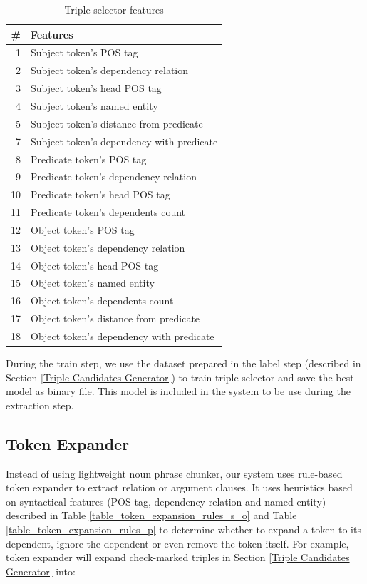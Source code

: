 \documentclass[peerreview,12pt]{IEEEtran}
\begin{document}
\begin{table}[!t]
\renewcommand{\arraystretch}{1.5}
\caption{Triple selector features}
\label{table_models_features}
\centering
\begin{tabular}{r l}
\hline
\textbf{\#} & \textbf{Features} \\
\hline
1 & Subject token's POS tag \\
2 & Subject token's dependency relation \\
3 & Subject token's head POS tag \\
4 & Subject token's named entity \\
5 & Subject token's distance from predicate \\
7 & Subject token's dependency with predicate \\
8 & Predicate token's POS tag \\
9 & Predicate token's dependency relation \\
10 & Predicate token's head POS tag \\
11 & Predicate token's dependents count \\
12 & Object token's POS tag \\
13 & Object token's dependency relation \\
14 & Object token's head POS tag \\
15 & Object token's named entity \\
16 & Object token's dependents count \\
17 & Object token's distance from predicate \\
18 & Object token's dependency with predicate \\
\end{tabular}
\end{table}

During the train step, we use the dataset prepared in the label step (described in Section \ref{Triple Candidates Generator}) to train triple selector and save the best model as binary file. This model is included in the system to be use during the extraction step.

\subsection{Token Expander}

Instead of using lightweight noun phrase chunker\cite{banko2007open}, our system uses rule-based token expander to extract relation or argument clauses. It uses heuristics based on syntactical features (POS tag, dependency relation and named-entity) described in Table \ref{table_token_expansion_rules_s_o} and Table \ref{table_token_expansion_rules_p} to determine whether to expand a token to its dependent, ignore the dependent or even remove the token itself. For example, token expander will expand check-marked triples in Section \ref{Triple Candidates Generator} into:
\end{document}
